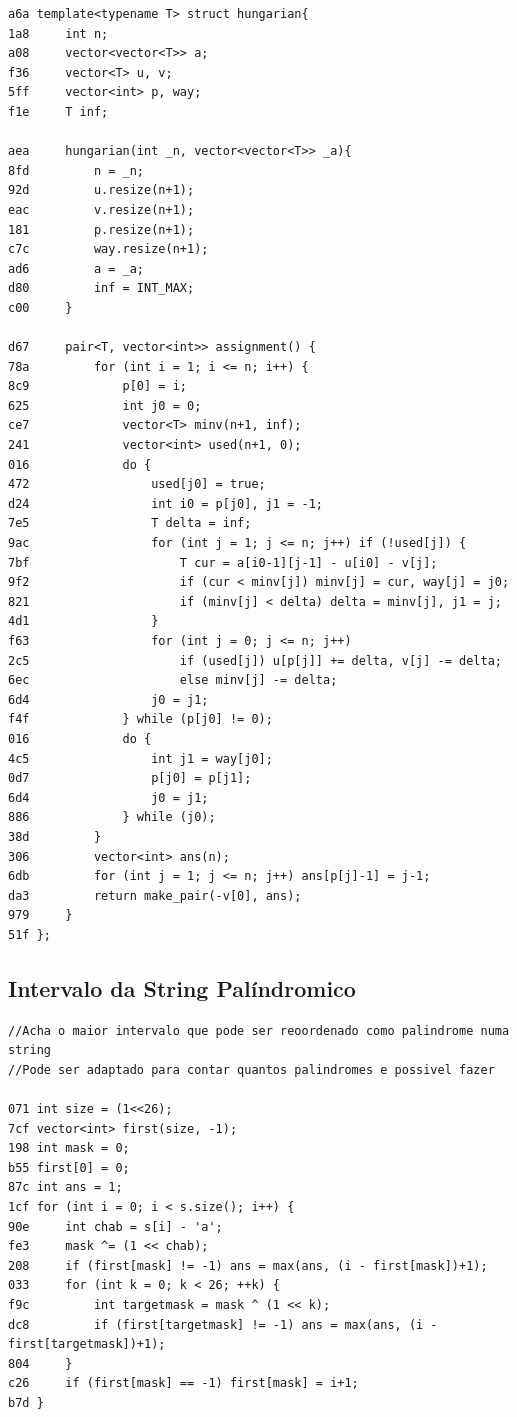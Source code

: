 \documentclass[11pt, a4paper, twoside]{article}
\begin{document}
{{\begin{lstlisting}
a6a template<typename T> struct hungarian{
1a8     int n;
a08     vector<vector<T>> a;
f36     vector<T> u, v;
5ff     vector<int> p, way;
f1e     T inf;
    
aea     hungarian(int _n, vector<vector<T>> _a){
8fd         n = _n; 
92d         u.resize(n+1);
eac         v.resize(n+1);
181         p.resize(n+1); 
c7c         way.resize(n+1);
ad6         a = _a;
d80         inf = INT_MAX;
c00     }
    
d67    	pair<T, vector<int>> assignment() {
78a 		for (int i = 1; i <= n; i++) {
8c9 			p[0] = i;
625 			int j0 = 0;
ce7 			vector<T> minv(n+1, inf);
241 			vector<int> used(n+1, 0);
016 			do {
472 				used[j0] = true;
d24 				int i0 = p[j0], j1 = -1;
7e5 				T delta = inf;
9ac 				for (int j = 1; j <= n; j++) if (!used[j]) {
7bf 					T cur = a[i0-1][j-1] - u[i0] - v[j];
9f2 					if (cur < minv[j]) minv[j] = cur, way[j] = j0;
821 					if (minv[j] < delta) delta = minv[j], j1 = j;
4d1 				}
f63 				for (int j = 0; j <= n; j++)
2c5 					if (used[j]) u[p[j]] += delta, v[j] -= delta;
6ec 					else minv[j] -= delta;
6d4 				j0 = j1;
f4f 			} while (p[j0] != 0);
016 			do {
4c5 				int j1 = way[j0];
0d7 				p[j0] = p[j1];
6d4 				j0 = j1;
886 			} while (j0);
38d 		}
306 		vector<int> ans(n);
6db 		for (int j = 1; j <= n; j++) ans[p[j]-1] = j-1;
da3 		return make_pair(-v[0], ans);
979 	}
51f };
\end{lstlisting}

\subsection{Intervalo da String Palíndromico}
\begin{lstlisting}
//Acha o maior intervalo que pode ser reoordenado como palindrome numa string
//Pode ser adaptado para contar quantos palindromes e possivel fazer 

071 int size = (1<<26);
7cf vector<int> first(size, -1);
198 int mask = 0;
b55 first[0] = 0;
87c int ans = 1;
1cf for (int i = 0; i < s.size(); i++) {
90e     int chab = s[i] - 'a';
fe3     mask ^= (1 << chab);
208     if (first[mask] != -1) ans = max(ans, (i - first[mask])+1);
033     for (int k = 0; k < 26; ++k) {
f9c         int targetmask = mask ^ (1 << k);
dc8         if (first[targetmask] != -1) ans = max(ans, (i - first[targetmask])+1);
804     }
c26     if (first[mask] == -1) first[mask] = i+1;
b7d }
\end{lstlisting}

}}
\end{document}

